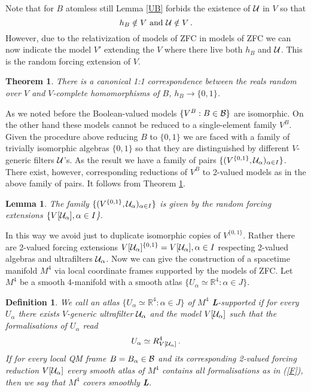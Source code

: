 \documentclass[12pt]{article}
\newtheorem{Theorem}{Theorem}
\newtheorem{Definition}{Definition}
\newtheorem{Lemma}{Lemma}
\begin{document}
Note that for $B$ atomless still Lemma \ref{UB} forbids the existence of ${\cal U}$ in $V$ so that \[h_B\notin V \text{ and } {\cal U}\notin V\,. \] 
However, due to the relativization of models of ZFC in models of ZFC we can now indicate the model $V'$ extending the $V$ where there live both $h_B$ and ${\cal U}$. This is the random forcing extension of $V$.
\begin{Theorem}\cite[p.36]{Solovay1970}\label{Th1}
There is a canonical 1:1 correspondence between the reals random over $V$ and $V$-complete homomorphisms of $B$, $h_B\to \{0,1\}$.
\end{Theorem}
As we noted before the Boolean-valued models $\{V^B: B\in {\cal B}\}$ are isomorphic. On the other hand these models cannot be reduced to a single-element family $V^B$. Given the procedure above reducing $B$ to $\{0,1\}$ we are faced with a family of trivially isomorphic algebras $\{0,1\}$ so that they are distinguished by different $V$-generic filters ${\cal U}$'s. As the result we have a family of pairs $\{(V^{\{0,1\}},{\cal U}_{\alpha})_{\alpha\in I}\} $. There exist, however, corresponding reductions of $V^B$ to 2-valued models as in the above family of pairs. It follows from Theorem \ref{Th1}.
\begin{Lemma}
The family $\{(V^{\{0,1\}},{\cal U}_{\alpha})_{\alpha\in I}\} $ is given by the random forcing extensions $\{ V[{\cal U}_{\alpha}], \alpha\in I$\}.  
\end{Lemma}
In this way we avoid just to duplicate isomorphic copies of $V^{\{0,1\}}$. Rather there are 2-valued forcing extensions $V[{\cal U}_{\alpha}]^{\{0,1\}}=V[{\cal U}_{\alpha}], \alpha\in I$ respecting 2-valued algebras and ultrafilters ${\cal U}_{\alpha}$.
Now we can give the construction of a spacetime manifold $M^4$ via local coordinate frames supported by the models of ZFC. Let $M^4$ be a smooth 4-manifold with a smooth atlas $\{ U_{\alpha}\simeq \mathbb{R}^4:\alpha \in J \}$.
\begin{Definition}\label{def1}
We call an atlas $\{ U_{\alpha}\simeq \mathbb{R}^4:\alpha \in J \}$ of $M^4$ {\bf L}-supported if for every $U_{\alpha}$ there exists $V$-generic ultrafilter ${\cal U}_{\alpha}$ and the model $V[{\cal U}_{\alpha}]$ such that the formalisations of $U_{\alpha}$ read
\begin{equation}\label{F} U_{\alpha}\simeq R^4_{V[{\cal U}_{\alpha}]}\,. \end{equation}
If for every local QM frame $B=B_{\alpha}\in {\cal B}$ and its corresponding 2-valued forcing reduction $V[{\cal U}_{\alpha}]$ every smooth atlas of $M^4$ contains all formalisations as in (\ref{F}), then we say that $M^4$ covers smoothly {\bf L}.  
\end{Definition}
\end{document}
